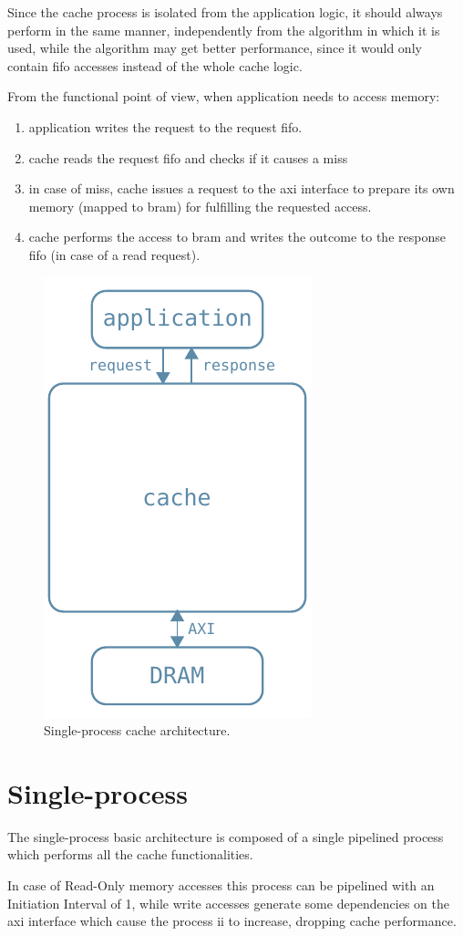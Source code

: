 \documentclass[11pt,a4paper,oneside]{memoir}
\begin{document}
Since the cache process is isolated from the application logic, it should
always perform in the same manner, independently from the algorithm in which it
is used, while the algorithm may get better performance, since it would only
contain \ac{fifo} accesses instead of the whole cache logic.

\bigskip
From the functional point of view, when application needs to access memory:
\begin{enumerate}
	\item application writes the request to the request \ac{fifo}.
	\item cache reads the request \ac{fifo} and checks if it causes a miss
	\item in case of miss, cache issues a request to the \ac{axi} interface
		to prepare its own memory (mapped to \ac{bram}) for fulfilling
		the requested access.
	\item cache performs the access to \ac{bram} and writes the outcome to
		the response \ac{fifo} (in case of a read request).
\end{enumerate}

\begin{figure}
	\centering
	\includegraphics[width=.3\textwidth]{basic_arch}
	\caption{Single-process cache architecture.}
	\label{fig:basic_arch}
\end{figure}

\section{Single-process}
The single-process basic architecture is composed of a single pipelined process
which performs all the cache functionalities.

In case of Read-Only memory accesses this process can be pipelined with an
Initiation Interval of 1, while write accesses generate some dependencies on the
\ac{axi} interface which cause the process \ac{ii} to increase, dropping cache
performance.
\end{document}
